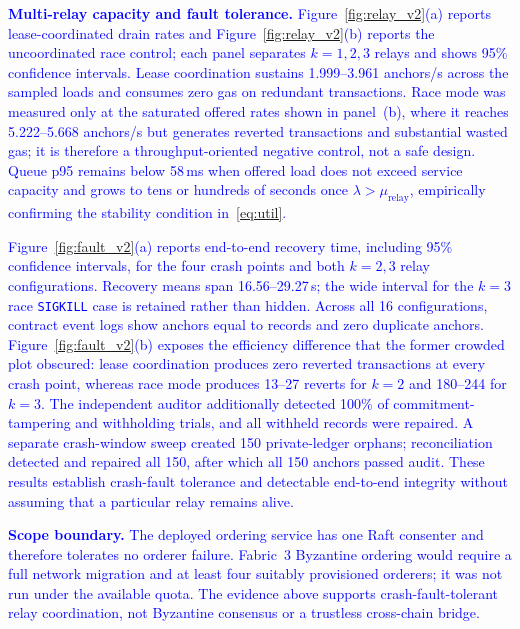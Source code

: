 \documentclass[final,5p,times,twocolumn]{elsarticle}
\begin{document}
\textcolor{blue}{\textbf{Multi-relay capacity and fault tolerance.} Figure~\ref{fig:relay_v2}(a) reports lease-coordinated drain rates and Figure~\ref{fig:relay_v2}(b) reports the uncoordinated race control; each panel separates $k=1,2,3$ relays and shows 95\% confidence intervals. Lease coordination sustains 1.999--3.961 anchors/s across the sampled loads and consumes zero gas on redundant transactions. Race mode was measured only at the saturated offered rates shown in panel~(b), where it reaches 5.222--5.668 anchors/s but generates reverted transactions and substantial wasted gas; it is therefore a throughput-oriented negative control, not a safe design. Queue p95 remains below 58\,ms when offered load does not exceed service capacity and grows to tens or hundreds of seconds once $\lambda>\mu_{\mathrm{relay}}$, empirically confirming the stability condition in~\eqref{eq:util}.}


\textcolor{blue}{Figure~\ref{fig:fault_v2}(a) reports end-to-end recovery time, including 95\% confidence intervals, for the four crash points and both $k=2,3$ relay configurations. Recovery means span 16.56--29.27\,s; the wide interval for the $k=3$ race \texttt{SIGKILL} case is retained rather than hidden. Across all 16 configurations, contract event logs show anchors equal to records and zero duplicate anchors. Figure~\ref{fig:fault_v2}(b) exposes the efficiency difference that the former crowded plot obscured: lease coordination produces zero reverted transactions at every crash point, whereas race mode produces 13--27 reverts for $k=2$ and 180--244 for $k=3$. The independent auditor additionally detected 100\% of commitment-tampering and withholding trials, and all withheld records were repaired. A separate crash-window sweep created 150 private-ledger orphans; reconciliation detected and repaired all 150, after which all 150 anchors passed audit. These results establish crash-fault tolerance and detectable end-to-end integrity without assuming that a particular relay remains alive.}



\textcolor{blue}{\textbf{Scope boundary.} The deployed ordering service has one Raft consenter and therefore tolerates no orderer failure. Fabric~3 Byzantine ordering would require a full network migration and at least four suitably provisioned orderers; it was not run under the available quota. The evidence above supports crash-fault-tolerant relay coordination, not Byzantine consensus or a trustless cross-chain bridge.}

\iffalse
\end{document}
